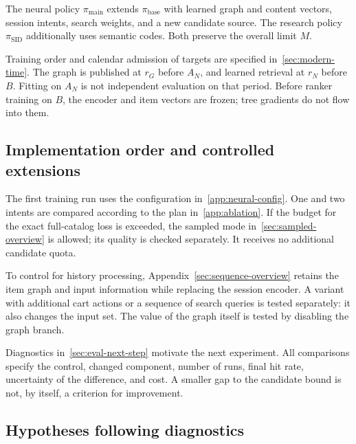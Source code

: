 \documentclass[12pt,a4paper]{article}
\theoremstyle{plainru}
\begin{document}
The neural policy $\pi_{\mathrm{main}}$ extends
$\pi_{\mathrm{base}}$ with learned graph and content vectors,
session intents, search weights, and a new candidate source.
The research policy $\pi_{\mathrm{SID}}$ additionally uses
semantic codes. Both preserve the overall limit $M$.

Training order and calendar admission of targets are specified in~\ref{sec:modern-time}.
The graph is published at $r_G$ before $A_N$, and learned retrieval at $r_N$ before $B$.
Fitting on $A_N$ is not independent evaluation on that period.
Before ranker training on $B$, the encoder and item vectors
are frozen; tree gradients do not flow into them.

\subsection{Implementation order and controlled extensions}
\label{sec:research-stages}

The first training run uses the configuration in~\ref{app:neural-config}.
One and two intents are compared according to the plan in~\ref{app:ablation}.
If the budget for the exact full-catalog loss is exceeded,
the sampled mode in~\ref{sec:sampled-overview} is allowed; its quality is checked
separately. It receives no additional candidate quota.

To control for history processing, Appendix~\ref{sec:sequence-overview}
retains the item graph and input information while replacing the session encoder.
A variant with additional cart actions or a sequence of
search queries is tested separately: it also changes the input set.
The value of the graph itself is tested by disabling the graph branch.

Diagnostics in~\ref{sec:eval-next-step} motivate the next experiment.
All comparisons specify the control, changed component,
number of runs, final hit rate, uncertainty of the difference, and cost.
A smaller gap to the candidate bound is not, by itself,
a criterion for improvement.

\subsection{Hypotheses following diagnostics}\label{sec:research-hypotheses}
\end{document}
